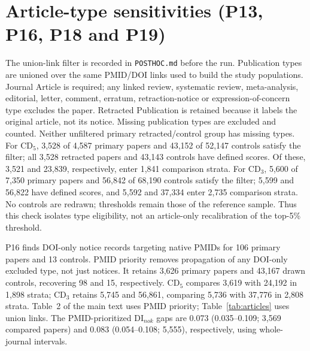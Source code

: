 \section{Article-type sensitivities (P13, P16, P18 and P19)}\label{sec:s-articles}
The union-link filter is recorded in \texttt{POSTHOC.md} before the run. Publication types are unioned over the same
PMID/DOI links used to build the study populations. Journal Article is required; any linked review,
systematic review, meta-analysis, editorial, letter, comment, erratum, retraction-notice or expression-of-concern
type excludes the paper. Retracted Publication is retained because it labels the original article, not its notice.
Missing publication types are excluded and counted.
Neither unfiltered primary retracted/control group has missing types. For CD$_5$, 3,528 of 4,587 primary papers
and 43,152 of 52,147 controls satisfy the filter; all 3,528 retracted papers and 43,143 controls have defined
scores. Of these, 3,521 and 23,839, respectively, enter 1,841 comparison strata.
For CD$_3$, 5,600 of 7,350 primary papers and 56,842 of 68,190 controls satisfy the filter; 5,599 and 56,822 have
defined scores, and 5,592 and 37,334 enter 2,735 comparison strata. No controls are redrawn; thresholds remain those
of the reference sample. Thus this check isolates type eligibility, not an article-only recalibration
of the top-5\% threshold.

P16 finds DOI-only notice records targeting native PMIDs for 106 primary papers and 13 controls.
PMID priority removes propagation of any DOI-only excluded type, not just notices.
It retains 3,626 primary papers and 43,167 drawn controls, recovering 98 and 15, respectively.
CD$_5$ compares 3,619 with 24,192 in 1,898 strata; CD$_3$ retains 5,745 and 56,861, comparing 5,736 with 37,776
in 2,808 strata. Table~2 of the main text uses PMID priority; Table~\ref{tab:articles} uses union links.
The PMID-prioritized DI$_{nok}$ gaps are 0.073 (0.035--0.109; 3,569 compared papers) and
0.083 (0.054--0.108; 5,555), respectively, using whole-journal intervals.

